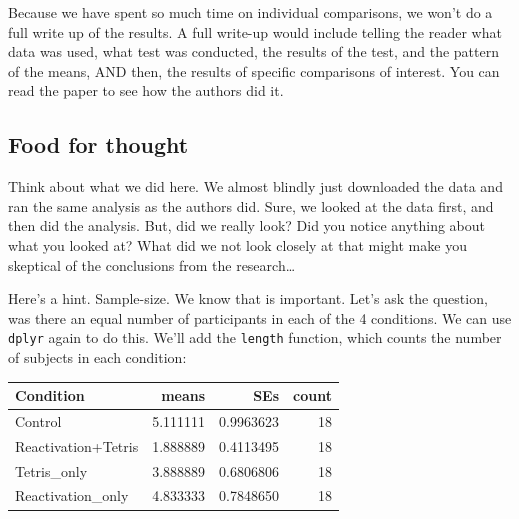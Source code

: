 \documentclass[]{book}
\newenvironment{Shaded}{\begin{snugshade}}{\end{snugshade}}
\newcommand{\KeywordTok}[1]{\textcolor[rgb]{0.13,0.29,0.53}{\textbf{#1}}}
\newcommand{\DataTypeTok}[1]{\textcolor[rgb]{0.13,0.29,0.53}{#1}}
\newcommand{\StringTok}[1]{\textcolor[rgb]{0.31,0.60,0.02}{#1}}
\newcommand{\OperatorTok}[1]{\textcolor[rgb]{0.81,0.36,0.00}{\textbf{#1}}}
\newcommand{\NormalTok}[1]{#1}
\begin{document}
Because we have spent so much time on individual comparisons, we won't
do a full write up of the results. A full write-up would include telling
the reader what data was used, what test was conducted, the results of
the test, and the pattern of the means, AND then, the results of
specific comparisons of interest. You can read the paper to see how the
authors did it.

\subsection{Food for thought}\label{food-for-thought}

Think about what we did here. We almost blindly just downloaded the data
and ran the same analysis as the authors did. Sure, we looked at the
data first, and then did the analysis. But, did we really look? Did you
notice anything about what you looked at? What did we not look closely
at that might make you skeptical of the conclusions from the
research\ldots{}

Here's a hint. Sample-size. We know that is important. Let's ask the
question, was there an equal number of participants in each of the 4
conditions. We can use \texttt{dplyr} again to do this. We'll add the
\texttt{length} function, which counts the number of subjects in each
condition:

\begin{Shaded}
\end{Shaded}

\begin{tabular}{l|r|r|r}
\hline
Condition & means & SEs & count\\
\hline
Control & 5.111111 & 0.9963623 & 18\\
\hline
Reactivation+Tetris & 1.888889 & 0.4113495 & 18\\
\hline
Tetris\_only & 3.888889 & 0.6806806 & 18\\
\hline
Reactivation\_only & 4.833333 & 0.7848650 & 18\\
\hline
\end{tabular}
\end{document}
